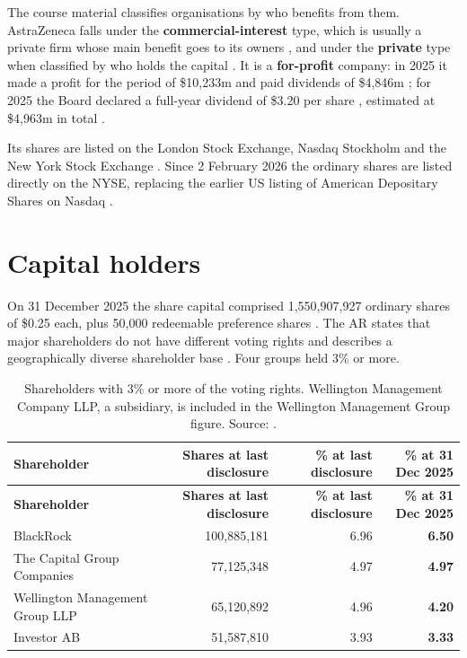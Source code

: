 The course material classifies organisations by who benefits from them. AstraZeneca falls under the \textbf{commercial-interest} type, which is usually a private firm whose main benefit goes to its owners \cite[pp.~4--5]{INT}, and under the \textbf{private} type when classified by who holds the capital \cite[p.~6]{INT}. It is a \textbf{for-profit} company: in 2025 it made a profit for the period of \$10,233m and paid dividends of \$4,846m \cite[p.~125]{AR}; for 2025 the Board declared a full-year dividend of \$3.20 per share \cite[p.~3]{AR}, estimated at \$4,963m in total \cite[p.~225]{AR}.

Its shares are listed on the London Stock Exchange, Nasdaq Stockholm and the New York Stock Exchange \cite[p.~71]{AR}. Since 2 February 2026 the ordinary shares are listed directly on the NYSE, replacing the earlier US listing of American Depositary Shares on Nasdaq \cite[p.~50]{AR}.

\section{Capital holders}

On 31 December 2025 the share capital comprised 1,550,907,927 ordinary shares of \$0.25 each, plus 50,000 redeemable preference shares \cite[p.~224]{AR}. The AR states that major shareholders do not have different voting rights \cite[p.~225]{AR} and describes a geographically diverse shareholder base \cite[p.~76]{AR}. Four groups held 3\% or more.

\begin{xltabular}{\linewidth}{@{}Yrrr@{}}
\caption{Shareholders with 3\% or more of the voting rights. Wellington Management Company LLP, a subsidiary, is included in the Wellington Management Group figure. Source: \cite[p.~225]{AR}.}\label{tab:acionistas}\\*
\toprule
\textbf{Shareholder} & \textbf{Shares at last disclosure} & \textbf{\% at last disclosure} & \textbf{\% at 31 Dec 2025} \\*
\midrule
\endfirsthead
\toprule
\textbf{Shareholder} & \textbf{Shares at last disclosure} & \textbf{\% at last disclosure} & \textbf{\% at 31 Dec 2025} \\*
\midrule
\endhead
\bottomrule
\endfoot
BlackRock & 100,885,181 & 6.96 & \textbf{6.50} \\
The Capital Group Companies & 77,125,348 & 4.97 & \textbf{4.97} \\
Wellington Management Group LLP & 65,120,892 & 4.96 & \textbf{4.20} \\
Investor AB & 51,587,810 & 3.93 & \textbf{3.33} \\
\end{xltabular}

